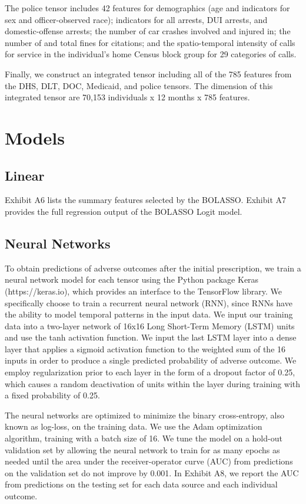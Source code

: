\documentclass[11pt, letter]{article}
\begin{document}
The police tensor includes 42 features for demographics (age and indicators for sex and officer-observed race); indicators for all arrests, DUI arrests, and domestic-offense arrests; the number of car crashes involved and injured in; the number of and total fines for citations; and the spatio-temporal intensity of calls for service in the individual's home Census block group for 29 categories of calls.

Finally, we construct an integrated tensor including all of the 785 features from the DHS, DLT, DOC, Medicaid, and police tensors. The dimension of this integrated tensor are 70,153 individuals x 12 months x 785 features.

\section{Models}

\subsection{Linear}

Exhibit A6 lists the summary features selected by the BOLASSO. Exhibit A7 provides the full regression output of the BOLASSO Logit model.

\subsection{Neural Networks}

To obtain predictions of adverse outcomes after the initial prescription, we train a neural network model for each tensor using the Python package Keras (https://keras.io), which provides an interface to the TensorFlow library. We specifically choose to train a recurrent neural network (RNN), since RNNs have the ability to model temporal patterns in the input data. We input our training data into a two-layer network of 16x16 Long Short-Term Memory (LSTM) units and use the tanh activation function. We input the last LSTM layer into a dense layer that applies a sigmoid activation function to the weighted sum of the 16 inputs in order to produce a single predicted probability of adverse outcome. We employ regularization prior to each layer in the form of a dropout factor of 0.25, which causes a random deactivation of units within the layer during training with a fixed probability of 0.25.

The neural networks are optimized to minimize the binary cross-entropy, also known as log-loss, on the training data. We use the Adam optimization algorithm, training with a batch size of 16. We tune the model on a hold-out validation set by allowing the neural network to train for as many epochs as needed until the area under the receiver-operator curve (AUC) from predictions on the validation set do not improve by 0.001. In Exhibit A8, we report the AUC from predictions on the testing set for each data source and each individual outcome.
\end{document}
